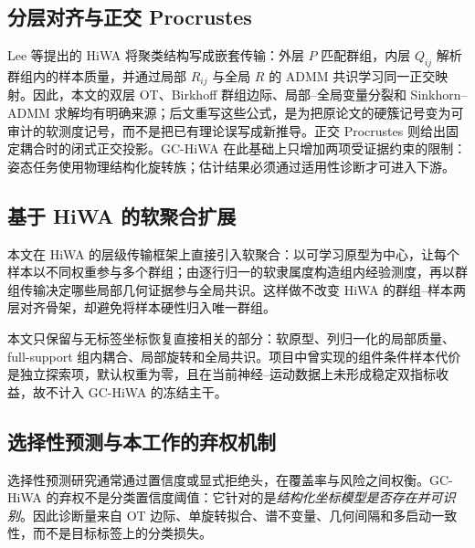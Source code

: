 \documentclass[10pt,a4paper,fontset=windows]{ctexart}
\theoremstyle{definition}
\theoremstyle{remark}
\begin{document}
\subsection{分层对齐与正交 Procrustes}
Lee 等提出的 HiWA 将聚类结构写成嵌套传输：外层 $P$ 匹配群组，内层 $Q_{ij}$ 解析群组内的样本质量，并通过局部 $R_{ij}$ 与全局 $R$ 的 ADMM 共识学习同一正交映射\cite{lee2019hierarchical}。因此，本文的双层 OT、Birkhoff 群组边际、局部--全局变量分裂和 Sinkhorn--ADMM 求解均有明确来源；后文重写这些公式，是为把原论文的硬簇记号变为可审计的软测度记号，而不是把已有理论误写成新推导。正交 Procrustes 则给出固定耦合时的闭式正交投影\cite{umeyama1991least}。GC-HiWA 在此基础上只增加两项受证据约束的限制：姿态任务使用物理结构化旋转族；估计结果必须通过适用性诊断才可进入下游。

\subsection{基于 HiWA 的软聚合扩展}
本文在 HiWA 的层级传输框架上直接引入软聚合：以可学习原型为中心，让每个样本以不同权重参与多个群组；由逐行归一的软隶属度构造组内经验测度，再以群组传输决定哪些局部几何证据参与全局共识。这样做不改变 HiWA 的群组--样本两层对齐骨架，却避免将样本硬性归入唯一群组。

本文只保留与无标签坐标恢复直接相关的部分：软原型、列归一化的局部质量、full-support 组内耦合、局部旋转和全局共识。项目中曾实现的组件条件样本代价是独立探索项，默认权重为零，且在当前神经--运动数据上未形成稳定双指标收益，故不计入 GC-HiWA 的冻结主干。

\subsection{选择性预测与本工作的弃权机制}
选择性预测研究通常通过置信度或显式拒绝头，在覆盖率与风险之间权衡\cite{geifman2019selectivenet}。GC-HiWA 的弃权不是分类置信度阈值：它针对的是\emph{结构化坐标模型是否存在并可识别}。因此诊断量来自 OT 边际、单旋转拟合、谱不变量、几何间隔和多启动一致性，而不是目标标签上的分类损失。
\end{document}
